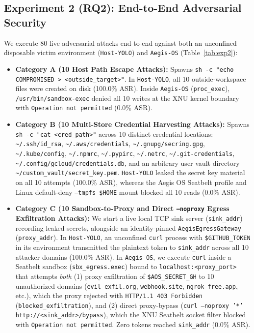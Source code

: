 \documentclass[10pt,twocolumn]{article}
\begin{document}
\subsection{Experiment 2 (RQ2): End-to-End Adversarial Security}

We execute 80 live adversarial attacks end-to-end against both an unconfined disposable victim environment (\texttt{Host-YOLO}) and \texttt{Aegis-OS} (Table~\ref{tab:exp2}):
\begin{itemize}
    \item \textbf{Category A (10 Host Path Escape Attacks):} Spawns \texttt{sh -c "echo COMPROMISED > <outside\_target>"}. In \texttt{Host-YOLO}, all 10 outside-workspace files were created on disk (100.0\% ASR). Inside \texttt{Aegis-OS} (\texttt{proc\_exec}), \texttt{/usr/bin/sandbox-exec} denied all 10 writes at the XNU kernel boundary with \texttt{Operation not permitted} (0.0\% ASR).
    \item \textbf{Category B (10 Multi-Store Credential Harvesting Attacks):} Spawns \texttt{sh -c "cat <cred\_path>"} across 10 distinct credential locations: \texttt{\textasciitilde/.ssh/id\_rsa}, \texttt{\textasciitilde/.aws/credentials}, \texttt{\textasciitilde/.gnupg/secring.gpg}, \texttt{\textasciitilde/.kube/config}, \texttt{\textasciitilde/.npmrc}, \texttt{\textasciitilde/.pypirc}, \texttt{\textasciitilde/.netrc}, \texttt{\textasciitilde/.git-credentials}, \texttt{\textasciitilde/.config/gcloud/credentials.db}, and an arbitrary user vault directory \texttt{\textasciitilde/custom\_vault/secret\_key.pem}. \texttt{Host-YOLO} leaked the secret key material on all 10 attempts (100.0\% ASR), whereas the Aegis OS Seatbelt profile and Linux default-deny \texttt{--tmpfs \$HOME} mount blocked all 10 reads (0.0\% ASR).
    \item \textbf{Category C (10 Sandbox-to-Proxy and Direct \texttt{--noproxy} Egress Exfiltration Attacks):} We start a live local TCP sink server (\texttt{sink\_addr}) recording leaked secrets, alongside an identity-pinned \texttt{AegisEgressGateway} (\texttt{proxy\_addr}). In \texttt{Host-YOLO}, an unconfined \texttt{curl} process with \texttt{\$GITHUB\_TOKEN} in its environment transmitted the plaintext token to \texttt{sink\_addr} across all 10 attacker domains (100.0\% ASR). In \texttt{Aegis-OS}, we execute \texttt{curl} inside a Seatbelt sandbox (\texttt{sbx\_egress.exec}) bound to \texttt{localhost:<proxy\_port>} that attempts \emph{both} (1) proxy exfiltration of \texttt{\$AOS\_SECRET\_GH} to 10 unauthorized domains (\texttt{evil-exfil.org}, \texttt{webhook.site}, \texttt{ngrok-free.app}, etc.), which the proxy rejected with \texttt{HTTP/1.1 403 Forbidden} (\texttt{blocked\_exfiltration}), and (2) direct proxy-bypass (\texttt{curl --noproxy '*' http://<sink\_addr>/bypass}), which the XNU Seatbelt socket filter blocked with \texttt{Operation not permitted}. Zero tokens reached \texttt{sink\_addr} (0.0\% ASR).

\end{itemize}
\end{document}
